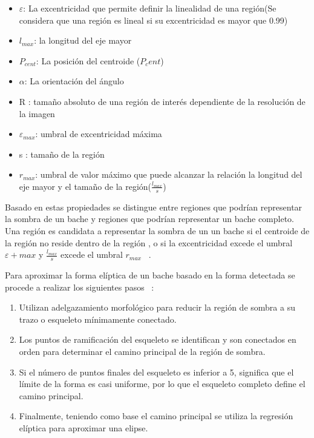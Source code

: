 	\begin{itemize}
		\item $\varepsilon$: La excentricidad que permite definir la linealidad de una región(Se considera que una región es lineal si su excentricidad
			es mayor que 0.99)
		\item $l_{max}$: la longitud del eje mayor 
		\item $P_{cent}$: La posición del centroide ($P_cent$)
		\item $\alpha$: La orientación del ángulo
		\item R : tamaño absoluto de una región de interés dependiente de la resolución de la imagen
		\item $\varepsilon_{max}$: umbral de excentricidad máxima
		\item s : tamaño de la región
		\item $r_{max}$: umbral de valor máximo que puede alcanzar la relación la longitud del eje mayor y el tamaño de la región($\frac{l_{max}
			}{s}$) \end{itemize} 

	Basado en estas propiedades se distingue entre regiones que podrían representar la sombra de un bache y regiones que podrían representar un bache
	completo. Una región es candidata a representar la sombra de un un bache si el centroide de la región no reside dentro de la región , o si la
	excentricidad excede el umbral $\varepsilon+{max}$ y $\frac{l_{max}}{s}$ excede el umbral $r_{max}$ ~.



	Para aproximar la forma elíptica de un bache basado en la forma detectada se procede a realizar los siguientes pasos ~:

	\begin{enumerate}
		\item Utilizan adelgazamiento morfológico para reducir la región de sombra  a su trazo o esqueleto mínimamente conectado.
		\item Los puntos de ramificación del esqueleto se identifican y son conectados en orden para determinar el camino principal de la región de sombra.
		\item Si el número de puntos finales del esqueleto es inferior a 5, significa que el límite de la forma es casi uniforme, por lo que el esqueleto
			completo define el camino principal.
		\item Finalmente, teniendo como base el camino principal se utiliza la regresión elíptica para aproximar una elipse.
	\end{enumerate}

